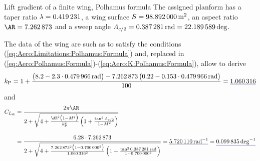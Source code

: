 \documentclass[[12pt,twoside]{book}
\begin{document}
\begin{myExampleX}{Lift gradient of a finite wing, Polhamus formula}{}
The assigned planform has
a taper ratio
$\lambda=\SI[round-precision=2]{\myTaperRatioWing}{}$,
a wing surface
$S=\SI[round-precision=1]{\myAreaWingMTsquared}{\metre^2}$,
an aspect ratio
$\AR=\num[round-precision=2]{\myAspectRatioWing}$
and a sweep angle
$\Lambda_{c/2}=\SI[round-precision=3]{\mySweepHalfChordWingRAD}{\radian}=\SI[round-precision=1]{\mySweepHalfChordWingDEG}{\deg}$.

The data of the wing are such as to satisfy the conditions (\ref{eq:Aero:Limitations:Polhamus:Formula})
and, replaced in (\ref{eq:Aero:Polhamus:Formula})-(\ref{eq:Aero:K:Polhamus:Formula}), 
allow to derive
\[
k_\mathrm{P} 
  =
    1+\dfrac{
      \big(
        \num[round-precision=1]{8.2}
        -\num[round-precision=1]{2.3}
        \cdot \SI[round-precision=3]{\mySweepLEWingRAD}{\radian}
      \big)
      - \num[round-precision=2]{\myAspectRatioWing}\,
      \big(
        \num[round-precision=2]{0.22}-\num[round-precision=3]{0.153}
        \cdot \SI[round-precision=3]{\mySweepLEWingRAD}{\radian}
      \big)
    }{\num[round-precision=0]{100}}
  = \mathunderline{mydarkblue}{ \SI[round-precision=2]{\myKPolhamus}{} }
\]
and
\[
\begin{split}
C_{L_{\mathlarger{\alpha}}} 
  & {}= 
   \frac{ 2\pi\AR
   }{
      2 + \sqrt{ 4+ \frac{\AR^2 \big(1-M^2\big)}{k_\mathrm{P}^2}\left({1+\frac{\tan^2\Lambda_{c/2}}{1-M^2}}\right)}
   }
\\[10pt]
  & {}= 
  \frac{ \num[round-precision=3]{6.28} \cdot \num[round-precision=2]{\myAspectRatioWing}
   }{
      2 + \sqrt{ 4+ 
      \frac{
        \num[round-precision=2]{\myAspectRatioWing}^2 \big( 1-\num[round-precision=2]{\myMach}^2 \big)
      }{
        \SI[round-precision=2]{\myKPolhamus}{}^2}
        \left({ 1 +
          \frac{
            \tan^2 \SI[round-precision=3]{\mySweepHalfChordWingRAD}{\radian}
          }{
            1-\num[round-precision=2]{\myMach}^2
          }
        }\right)
      }
   }
    =\mathunderline{mydarkblue}{ \SI[round-precision=2]{\myCLAlphaWingRAD}{\radian^{-1}} }
    =\mathunderline{mydarkblue}{ \SI[round-precision=3]{\myCLAlphaWingDEG}{\deg^{-1}} }
\end{split}
\]
\end{myExampleX}
\end{document}

